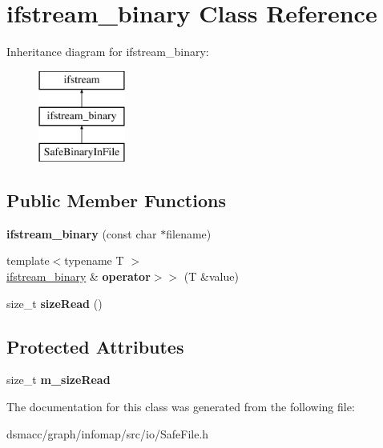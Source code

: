 \hypertarget{classifstream__binary}{}\section{ifstream\+\_\+binary Class Reference}
\label{classifstream__binary}
Inheritance diagram for ifstream\+\_\+binary\+:\begin{figure}[H]
\begin{center}
\leavevmode
\includegraphics[height=3.000000cm]{classifstream__binary}
\end{center}
\end{figure}
\subsection*{Public Member Functions}
\begin{DoxyCompactItemize}
\item 
\mbox{\label{classifstream__binary_ac7c7c03479b160cd0e93f62e492f842c}} 
{\bfseries ifstream\+\_\+binary} (const char $\ast$filename)
\item 
\mbox{\label{classifstream__binary_aae9698b1369f6a8dc57181b8aef4ff5f}} 
{\footnotesize template$<$typename T $>$ }\\\mbox{\hyperlink{classifstream__binary}{ifstream\+\_\+binary}} \& {\bfseries operator$>$$>$} (T \&value)
\item 
\mbox{\label{classifstream__binary_ad4c857c8d195e54671c3f833db47fa4e}} 
size\+\_\+t {\bfseries size\+Read} ()
\end{DoxyCompactItemize}
\subsection*{Protected Attributes}
\begin{DoxyCompactItemize}
\item 
\mbox{\label{classifstream__binary_a5b32ca02274d7680d6a3d4d55ce64efa}} 
size\+\_\+t {\bfseries m\+\_\+size\+Read}
\end{DoxyCompactItemize}


The documentation for this class was generated from the following file\+:\begin{DoxyCompactItemize}
\item 
dsmacc/graph/infomap/src/io/Safe\+File.\+h\end{DoxyCompactItemize}
